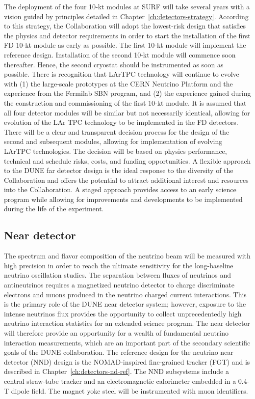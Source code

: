 The deployment of the four 10-kt modules at SURF will take several
years with a vision guided by principles detailed in
Chapter~\ref{ch:detectors-strategy}. According to this strategy, the
Collaboration will adopt the lowest-risk design that satisfies the
physics and detector requirements in order to start the
installation of the first FD 10-kt module as early as possible.
The first 10-kt module will implement the reference design. %
Installation of the second 10-kt module will commence
soon thereafter.  Hence, the second cryostat should be
instrumented as soon as possible.  There is recognition that
LArTPC technology will continue to evolve with (1) the large-scale
prototypes at the CERN Neutrino Platform and the experience from the
Fermilab SBN program, and (2) the experience gained during the
construction and commissioning of the first 10-kt module.  It is
assumed that all four detector modules will be similar but not
necessarily identical, allowing for evolution of the LAr TPC
technology to be implemented in the FD detectors. There will be a
clear and transparent decision process for the design of the second
and subsequent modules, allowing for implementation of evolving LArTPC
technologies. The decision will be based on physics performance,
technical and schedule risks, costs, and funding opportunities.  A
flexible approach to the DUNE far detector design is the ideal
response to the diversity of the Collaboration and offers the
potential to attract additional interest and resources into the
Collaboration. A staged approach provides access to an early science
program while allowing for improvements and developments to be
implemented during the life of the experiment.

\subsection{Near detector}
\label{sec:intro-dune-near-det}

The spectrum and flavor composition of the neutrino beam will be
measured with high precision in order to reach the ultimate
sensitivity for the long-baseline neutrino oscillation studies.  The
separation between fluxes of neutrinos and antineutrinos requires a
magnetized neutrino detector to charge discriminate electrons and
muons produced in the neutrino charged current interactions.  This is
the primary role of the DUNE near detector system; however, exposure
to the intense neutrinos flux provides the opportunity to collect
unprecedentedly high neutrino interaction statistics for an extended
science program.  The near detector will therefore provide an
opportunity for a wealth of fundamental neutrino interaction
measurements, which are an important part of the secondary scientific
goals of the DUNE collaboration.  The reference design for the
neutrino near detector (NND) design is the NOMAD-inspired fine-grained
tracker (FGT) and is described in
Chapter~\ref{ch:detectors-nd-ref}. The NND subsystems include a
central straw-tube tracker and an electromagnetic calorimeter embedded
in a 0.4-T dipole field. The magnet yoke steel will be instrumented
with muon identifiers.

